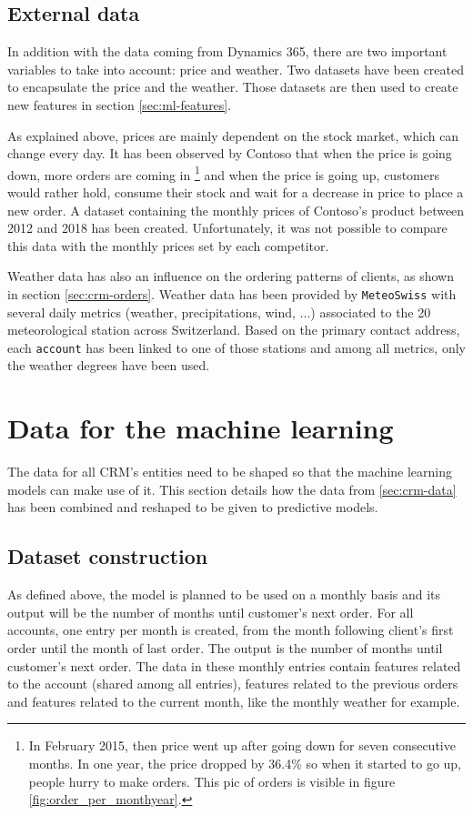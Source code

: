 \subsection{External data}\label{sec:external-data}
In addition with the data coming from Dynamics 365, there are two important variables to take into account: price and weather. Two datasets have been created to encapsulate the price and the weather. Those datasets are then used to create new features in section \ref{sec:ml-features}.

As explained above, prices are mainly dependent on the stock market, which can change every day. It has been observed by Contoso that when the price is going down, more orders are coming in \footnote{In February 2015, then price went up after going down for seven consecutive months. In one year, the price dropped by 36.4\% so when it started to go up, people hurry to make orders. This pic of orders is visible in figure \ref{fig:order_per_monthyear}.} and when the price is going up, customers would rather hold, consume their stock and wait for a decrease in price to place a new order. A dataset containing the monthly prices of Contoso's product between 2012 and 2018 has been created. Unfortunately, it was not possible to compare this data with the monthly prices set by each competitor.

Weather data has also an influence on the ordering patterns of clients, as shown in section \ref{sec:crm-orders}. Weather data has been provided by \texttt{MeteoSwiss} with several daily metrics (weather, precipitations, wind, ...) associated to the 20 meteorological station across Switzerland. Based on the primary contact address, each \texttt{account} has been linked to one of those stations and among all metrics, only the weather degrees \big[°C\big] have been used.


\section{Data for the machine learning}
The data for all CRM's entities need to be shaped so that the machine learning models can make use of it. This section details how the data from \ref{sec:crm-data} has been combined and reshaped to be given to predictive models.

\subsection{Dataset construction}\label{sec:data-shape-for-ml}
As defined above, the model is planned to be used on a monthly basis and its output will be the number of months until customer's next order. For all accounts, one entry per month is created, from the month following client's first order until the month of last order. The output is the number of months until customer's next order. The data in these monthly entries contain features related to the account (shared among all entries), features related to the previous orders and features related to the current month, like the monthly weather for example. 


